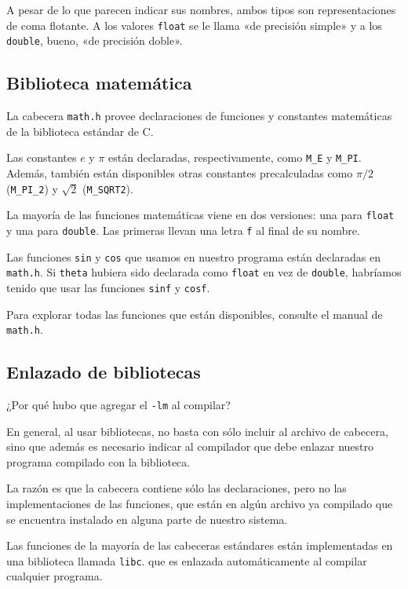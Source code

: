 A pesar de lo que parecen indicar sus nombres, ambos tipos son
representaciones de coma flotante. A los valores \lstinline!float! se le
llama «de precisión simple» y a los \lstinline!double!, bueno, «de
precisión doble».

\subsection{Biblioteca matemática}

La cabecera \lstinline!math.h! provee declaraciones de funciones y
constantes matemáticas de la biblioteca estándar de C.

Las constantes \(e\) y \(\pi\) están declaradas, respectivamente, como
\lstinline!M_E! y \lstinline!M_PI!. Además, también están disponibles
otras constantes precalculadas como \(\pi/2\) (\lstinline!M_PI_2!) y \(\sqrt 2\)
(\lstinline!M_SQRT2!).

La mayoría de las funciones matemáticas viene en dos versiones: una para
\lstinline!float! y una para \lstinline!double!. Las primeras llevan una
letra \lstinline!f! al final de su nombre.

Las funciones \lstinline!sin! y \lstinline!cos! que usamos en nuestro
programa están declaradas en \lstinline!math.h!. Si \lstinline!theta!
hubiera sido declarada como \lstinline!float! en vez de
\lstinline!double!, habríamos tenido que usar las funciones
\lstinline!sinf! y \lstinline!cosf!.

Para explorar todas las funciones que están disponibles, consulte el
manual de \lstinline!math.h!.

\subsection{Enlazado de bibliotecas}

¿Por qué hubo que agregar el \lstinline!-lm! al compilar?

En general, al usar bibliotecas, no basta con sólo incluir al archivo de
cabecera, sino que además es necesario indicar al compilador que debe
enlazar nuestro programa compilado con la biblioteca.

La razón es que la cabecera contiene sólo las declaraciones, pero no las
implementaciones de las funciones, que están en algún archivo ya
compilado que se encuentra instalado en alguna parte de nuestro sistema.

Las funciones de la mayoría de las cabeceras estándares están
implementadas en una biblioteca llamada \lstinline!libc!. que es
enlazada automáticamente al compilar cualquier programa.

